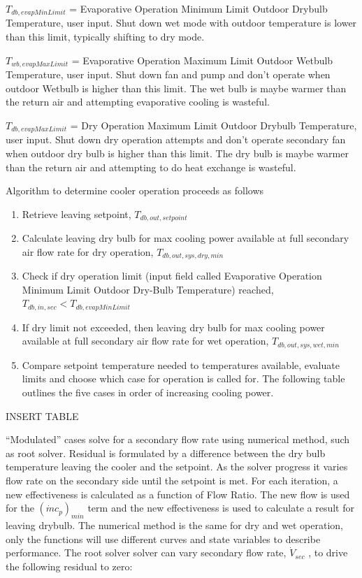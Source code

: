 \(T_{db,evapMinLimit}\) = Evaporative Operation Minimum Limit Outdoor Drybulb Temperature, user input. Shut down wet mode with outdoor temperature is lower than this limit, typically shifting to dry mode.

\(T_{wb,evapMaxLimit}\) = Evaporative Operation Maximum Limit Outdoor Wetbulb Temperature, user input. Shut down fan and pump and don't operate when outdoor Wetbulb is higher than this limit. The wet bulb is maybe warmer than the return air and attempting evaporative cooling is wasteful.

\(T_{db,evapMaxLimit}\) = Dry Operation Maximum Limit Outdoor Drybulb Temperature, user input. Shut down dry operation attempts and don't operate secondary fan when outdoor dry bulb is higher than this limit. The dry bulb is maybe warmer than the return air and attempting to do heat exchange is wasteful.

Algorithm to determine cooler operation proceeds as follows

\begin{enumerate}
\def\labelenumi{\arabic{enumi}.}
\item
  Retrieve leaving setpoint, \(T_{db,out,setpoint}\)
\item
  Calculate leaving dry bulb for max cooling power available at full secondary air flow rate for dry operation, \(T_{db,out,sys,dry,min}\)
\item
  Check if dry operation limit (input field called Evaporative Operation Minimum Limit Outdoor Dry-Bulb Temperature) reached, \(T_{db,in,sec}<T_{db,evapMinLimit}\)
\item
  If dry limit not exceeded, then leaving dry bulb for max cooling power available at full secondary air flow rate for wet operation, \(T_{db,out,sys,wet,min}\)
\item
  Compare setpoint temperature needed to temperatures available, evaluate limits and choose which case for operation is called for. The following table outlines the five cases in order of increasing cooling power.
\end{enumerate}

INSERT TABLE

``Modulated'' cases solve for a secondary flow rate using numerical method, such as root solver. Residual is formulated by a difference between the dry bulb temperature leaving the cooler and the setpoint. As the solver progress it varies flow rate on the secondary side until the setpoint is met. For each iteration, a new effectiveness is calculated as a function of Flow Ratio. The new flow is used for the \(\left(\dot{m}c_{p}\right)_{min}\) term and the new effectiveness is used to calculate a result for leaving drybulb. The numerical method is the same for dry and wet operation, only the functions will use different curves and state variables to describe performance. The root solver solver can vary secondary flow rate, \(\dot{V}_{sec}\) , to drive the following residual to zero:


